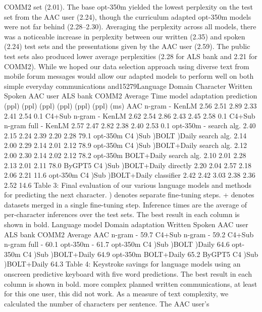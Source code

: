 COMM2 set (2.01). The base opt-350m yielded the
lowest perplexity on the test set from the AAC user
(2.24), though the curriculum adapted opt-350m
models were not far behind (2.28–2.30).
Averaging the perplexity across all models, there
was a noticeable increase in perplexity between
our written (2.35) and spoken (2.24) test sets and
the presentations given by the AAC user (2.59).
The public test sets also produced lower average perplexities (2.28 for ALS bank and 2.21 for
COMM2). While we hoped our data selection approach using diverse text from mobile forum messages would allow our adapted models to perform
well on both simple everyday communications and15279Language Domain Character Written Spoken AAC user ALS bank COMM2 Average Time
model adaptation prediction (ppl) (ppl) (ppl) (ppl) (ppl) (ppl) (ms)
AAC n-gram - KenLM 2.56 2.51 2.89 2.33 2.41 2.54 0.1
C4+Sub n-gram - KenLM 2.62 2.54 2.86 2.43 2.45 2.58 0.1
C4+Sub n-gram full - KenLM 2.57 2.47 2.82 2.38 2.40 2.53 0.1
opt-350m - search alg. 2.40 2.15 2.24 2.39 2.20 2.28 79.1
opt-350m C4 )Sub )BOLT )Daily search alg. 2.14 2.00 2.29 2.14 2.01 2.12 78.9
opt-350m C4 )Sub )BOLT+Daily search alg. 2.12 2.00 2.30 2.14 2.02 2.12 78.2
opt-350m BOLT+Daily search alg. 2.10 2.01 2.28 2.13 2.01 2.11 78.0
ByGPT5 C4 )Sub )BOLT+Daily directly 2.20 2.04 2.57 2.18 2.06 2.21 11.6
opt-350m C4 )Sub )BOLT+Daily classifier 2.42 2.42 3.03 2.38 2.36 2.52 14.6
Table 3: Final evaluation of our various language models and methods for predicting the next character. ) denotes
separate fine-tuning steps. + denotes datasets merged in a single fine-tuning step. Inference times are the average of
per-character inferences over the test sets. The best result in each column is shown in bold.
Language model Domain adaptation Written Spoken AAC user ALS bank COMM2 Average
AAC n-gram - 59.7%
C4+Sub n-gram - 59.2%
C4+Sub n-gram full - 60.1%
opt-350m - 61.7%
opt-350m C4 )Sub )BOLT )Daily 64.6%
opt-350m C4 )Sub )BOLT+Daily 64.9%
opt-350m BOLT+Daily 65.2%
ByGPT5 C4 )Sub )BOLT+Daily 64.3%
Table 4: Keystroke savings for language models using an onscreen predictive keyboard with five word predictions.
The best result in each column is shown in bold.
more complex planned written communications,
at least for this one user, this did not work. As a
measure of text complexity, we calculated the number of characters per sentence. The AAC user’s
